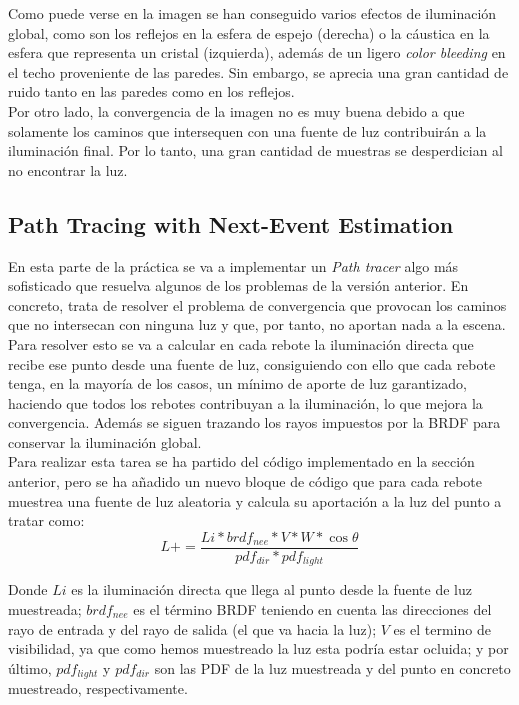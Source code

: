 \documentclass[10pt,oneside,a4paper]{article}
\begin{document}
Como puede verse en la imagen se han conseguido varios efectos de iluminación global, como son los reflejos en la esfera de espejo (derecha) o la cáustica en la esfera que representa un cristal (izquierda), además de un ligero \textit{color bleeding} en el techo proveniente de las paredes. Sin embargo, se aprecia una gran cantidad de ruido tanto en las paredes como en los reflejos.\\

Por otro lado, la convergencia de la imagen no es muy buena debido a que solamente los caminos que intersequen con una fuente de luz contribuirán a la iluminación final. Por lo tanto, una gran cantidad de muestras se desperdician al no encontrar la luz.

\subsection{Path Tracing with Next-Event Estimation}
En esta parte de la práctica se va a implementar un \textit{Path tracer} algo más sofisticado que resuelva algunos de los problemas de la versión anterior. En concreto, trata de resolver el problema de convergencia que provocan los caminos que no intersecan con ninguna luz y que, por tanto, no aportan nada a la escena. Para resolver esto se va a calcular en cada rebote la iluminación directa que recibe ese punto desde una fuente de luz, consiguiendo con ello que cada rebote tenga, en la mayoría de los casos, un mínimo de aporte de luz garantizado, haciendo que todos los rebotes contribuyan a la iluminación, lo que mejora la convergencia. Además se siguen trazando los rayos impuestos por la BRDF para conservar la iluminación global.\\

Para realizar esta tarea se ha partido del código implementado en la sección anterior, pero se ha añadido un nuevo bloque de código que para cada rebote muestrea una fuente de luz aleatoria y calcula su aportación a la luz del punto a tratar como:
$$ L += \frac{Li * brdf_{nee} * V * W * \cos\theta}{pdf_{dir} * pdf_{light}}$$

Donde $Li$ es la iluminación directa que llega al punto desde la fuente de luz muestreada; $brdf_{nee}$ es el término BRDF teniendo en cuenta las direcciones del rayo de entrada y del rayo de salida (el que va hacia la luz); $V$ es el termino de visibilidad, ya que como hemos muestreado la luz esta podría estar ocluida; y por último, $pdf_{light}$ y $pdf_{dir}$ son las PDF de la luz muestreada y del punto en concreto muestreado, respectivamente. \\
\end{document}
